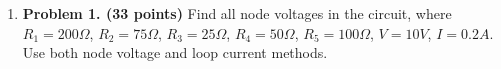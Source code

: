 \begin{enumerate}


\item {\bf Problem 1. (33 points)}
  Find all node voltages in the circuit, where $R_1=200\Omega$, 
  $R_2=75\Omega$, $R_3=25\Omega$, $R_4=50\Omega$, $R_5=100\Omega$,
  $V=10V$, $I=0.2A$. Use both node voltage and loop current methods.


  \begin{comment}
  {\bf Solution:}
  \begin{itemize}
    \item {\bf Node voltage:}
      \[ \begin{array}{ll}
	\mbox{left node:} & V_1/200+(V_1-V_2)/75=0.2 \\
	\mbox{middle node:} & (V_2-V_1)/75+V_2/25+V_3/100=0 \\
	\mbox{voltage source:} & V_3=V_2-V=V_2-10 \end{array} \]
      Solving this we get:
      \[ V_1=14.24,\;\;\;\;\;V_2=4.58,\;\;\;\;V_3=-5.42 \]
    \item {\bf Loop current:}
      first convert the current source $I=0.2A$ and the parallel resistor
      $R_1=200\Omega$ into a voltage source with $V_1=40V$ in series with
      $R_1=200\Omega$. Assume loop currents $I_a$ (left loop) and $I_b$
      (right loop, $R_4$ does not matter) and get loop current equations:
      \[ \begin{array}{ll}
	\mbox{left loop:} & (200+75+25)I_a-25I_b=40 \\
	\mbox{right loop:} & -25I_a+(100+25)I_b=-10 \end{array} \right. \]
      Solving these we get $I_a=0.129A$, $I_b=-0.054A$. 
      $V_2=(I_a-I_b)R_3=0.183\times 25=4.58V$, same as previous result.
  \end{itemize}
  \end{comment}

\begin{comment}
\item {\bf Problem 1 (33 pts)}   Answer the following questions:
  \begin{itemize}
  \item ({\bf 11 pts})
    The RMS values of the three AC voltages across R, L, and C are 
    known to be $V_1=4\,V$, $V_2=5\,V$, and $V_3=2\,V$, respectively. 
    Find the RMS voltage $V_0$ of the source. If the AC voltage source 
    is replaced by a DC voltage source $V_0=10\,V$, Find the three 
    voltages $V_1$, $V_2$, and $V_3$.


\end{comment}
\end{enumerate}
